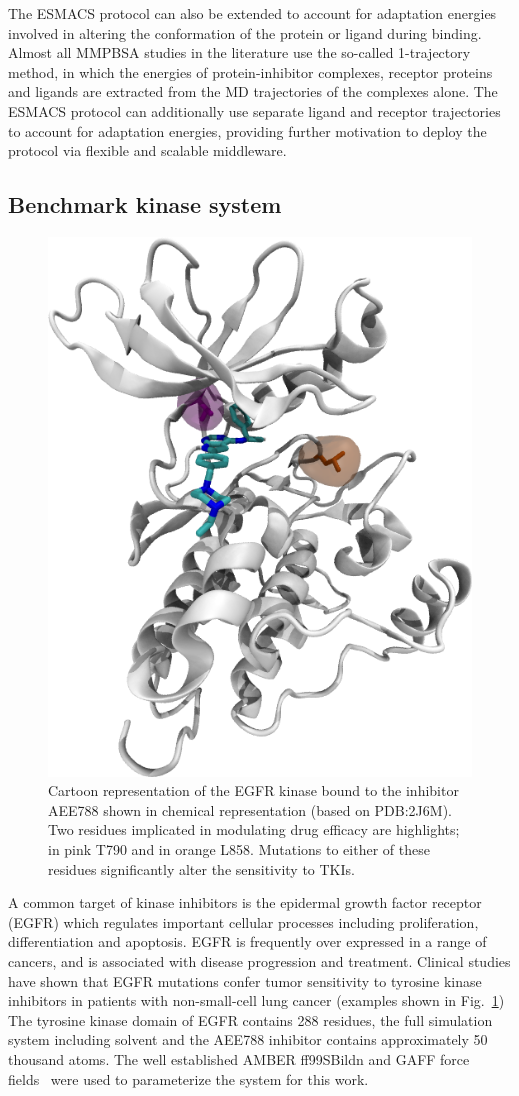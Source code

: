 \documentclass[conference]{IEEEtran}
\begin{document}
The ESMACS protocol can also be extended to account for adaptation energies
involved in altering the conformation of the protein or ligand during
binding. Almost all MMPBSA studies in the literature use the so-called
1-trajectory method, in which the energies of protein-inhibitor complexes,
receptor proteins and ligands are extracted from the MD trajectories of the
complexes alone. The ESMACS protocol can additionally use separate ligand and
receptor trajectories to account for adaptation energies, providing further
motivation to deploy the protocol via flexible and scalable middleware.

%
\subsection{Benchmark kinase system}

\begin{figure}
  \centering
  \includegraphics[width=0.60\columnwidth]{egfr.png}
  \caption{Cartoon representation of the EGFR kinase bound to the inhibitor
  AEE788 shown in chemical representation (based on PDB:2J6M). Two residues
  implicated in modulating drug efficacy are highlights; in pink T790 and in
  orange L858. Mutations to either of these residues significantly alter the
  sensitivity to TKIs.}\label{fig:egfr}
\end{figure}


A common target of kinase inhibitors is the epidermal growth factor receptor
(EGFR) which regulates important cellular processes including proliferation,
differentiation and apoptosis. EGFR is frequently over expressed in a range of
cancers, and is associated with disease progression and treatment. Clinical
studies have shown that EGFR mutations confer tumor sensitivity to tyrosine
kinase inhibitors in patients with non-small-cell lung cancer (examples shown
in Fig.~\ref{fig:egfr}) The tyrosine kinase domain of EGFR contains 288
residues, the full simulation system including solvent and the AEE788
inhibitor contains approximately 50 thousand atoms. The well established AMBER
ff99SBildn and GAFF force fields~\cite{Maier2015, Wang2004} were used to
parameterize the system for this work.
\end{document}
